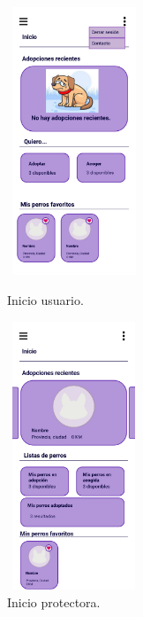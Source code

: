 \documentclass[a4paper, 12pt]{article}
\begin{document}
\begin{figure}[H]
   	\begin{minipage}{0.48\textwidth}
		\begin{center}
			{\includegraphics[height=8cm, width=4cm]{UserPage.jpg}\par}
			\caption{Inicio usuario.}
			\medskip
			\small

		\end{center}  
	\end{minipage}\hfill
   	\begin{minipage}{0.48\textwidth}
		\begin{center}
			{\includegraphics[height=8cm, width=4cm]{CompanyPage.jpg}\par}
			\caption{Inicio protectora.}
			\medskip			
		\end{center}  
	\end{minipage}\hfill
\end{figure}
\end{document}
